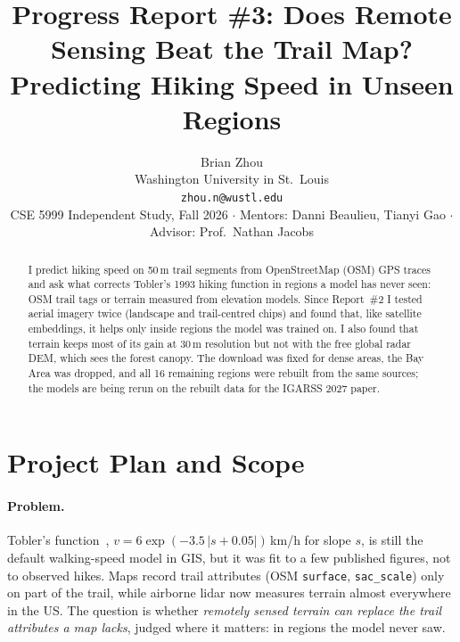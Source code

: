 \documentclass[10pt,twocolumn,letterpaper]{article}
\begin{document}
\title{Progress Report \#3: Does Remote Sensing Beat the Trail Map?\\Predicting Hiking Speed in Unseen Regions}

\author{Brian Zhou\\
Washington University in St.\ Louis\\
{\tt\small zhou.n@wustl.edu}\\
{\small CSE 5999 Independent Study, Fall 2026 \;$\cdot$\; Mentors: Danni Beaulieu, Tianyi Gao \;$\cdot$\; Advisor: Prof.\ Nathan Jacobs}
}
\maketitle

\begin{abstract}
I predict hiking speed on 50\,m trail segments from OpenStreetMap (OSM) GPS traces and ask what corrects Tobler's 1993 hiking function in regions a model has never seen: OSM trail tags or terrain measured from elevation models. Since Report~\#2 I tested aerial imagery twice (landscape and trail-centred chips) and found that, like satellite embeddings, it helps only inside regions the model was trained on. I also found that terrain keeps most of its gain at 30\,m resolution but not with the free global radar DEM, which sees the forest canopy. The download was fixed for dense areas, the Bay Area was dropped, and all 16 remaining regions were rebuilt from the same sources; the models are being rerun on the rebuilt data for the IGARSS 2027 paper.
\end{abstract}

\section{Project Plan and Scope}
\label{sec:plan}

\paragraph{Problem.} Tobler's function~\cite{tobler1993}, $v = 6\exp(-3.5\,|s+0.05|)$\,km/h for slope $s$, is still the default walking-speed model in GIS, but it was fit to a few published figures, not to observed hikes. Maps record trail attributes (OSM \texttt{surface}, \texttt{sac\_scale}) only on part of the trail, while airborne lidar now measures terrain almost everywhere in the US. The question is whether \emph{remotely sensed terrain can replace the trail attributes a map lacks}, judged where it matters: in regions the model never saw.
\end{document}
